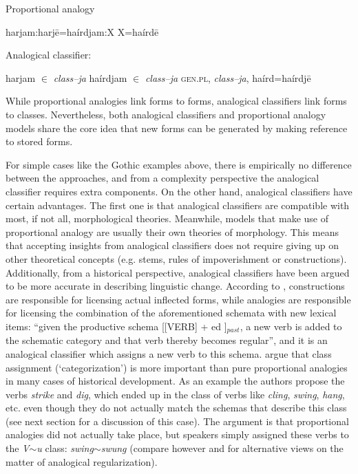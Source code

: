 \begin{exe}
    \ex \label{exe-proportional-schema} Proportional analogy
    \begin{xlist}
        \ex harjam:harjē=haírdjam:X
        \ex X=haírdē
    \end{xlist}

    \ex \label{exe-classifier-schema} Analogical classifier:
    \begin{xlist}
        \ex harjam $\in$ \textit{class--ja}
        \ex haírdjam $\in$ \textit{class--ja}
        \ex \textsc{gen.pl}, \textit{class--ja}, haírd=haírdjē
    \end{xlist}
\end{exe}


While proportional analogies link forms to forms, analogical classifiers link forms to classes. Nevertheless, both analogical classifiers and proportional analogy models share the core idea that new forms can be generated by making reference to stored forms.

For simple cases like the Gothic examples above, there is empirically no difference between the approaches, and from a complexity perspective the analogical classifier requires extra components. On the other hand, analogical classifiers have certain advantages. The first one is that analogical classifiers are compatible with most, if not all, morphological theories. Meanwhile, models that make use of proportional analogy are usually their own theories of morphology. This means that accepting insights from analogical classifiers does not require giving up on other theoretical concepts (e.g. stems, rules of impoverishment or constructions). Additionally, from a historical perspective, analogical classifiers have been argued to be more accurate in describing linguistic change. According to \textcite[506]{Bybee.2015}, constructions are responsible for licensing actual inflected forms, while analogies are responsible for licensing the combination of the aforementioned schemata with new lexical items: ``given the productive schema [[VERB] + ed ]$_{past}$, a new verb is added to the schematic category and that verb thereby becomes regular'', and it is an analogical classifier which assigns a new verb to this schema. \textcite{Bybee.2015} argue that class assignment (`categorization') is more important than pure proportional analogies in many cases of historical development. As an example the authors propose the verbs \textit{strike} and \textit{dig}, which ended up in the class of verbs like \textit{cling}, \textit{swing}, \textit{hang}, etc. even though they do not actually match the schemas that describe this class (see next section for a discussion of this case). The argument is that proportional analogies did not actually take place, but speakers simply assigned these verbs to the \textit{V$\sim$u} class: \textit{swing}$\sim$\textit{swung} (compare however \textcite{DeSmet.2016} and \textcite{Fertig.2013} for alternative views on the matter of analogical regularization).


